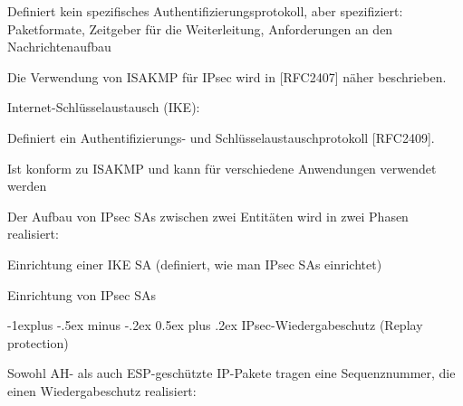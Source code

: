 \documentclass[a4paper]{article}
\makeatletter
\renewcommand{\subsection}{\@startsection{subsection}{2}{0mm}%
 {-1explus -.5ex minus -.2ex}%
 {0.5ex plus .2ex}%
 {\normalfont\normalsize\bfseries}}
\makeatother
\begin{document}
\begin{multicols}{3}
\begin{itemize*}
\begin{itemize*}
\begin{itemize*}
                        \item Definiert kein spezifisches Authentifizierungsprotokoll, aber spezifiziert: Paketformate, Zeitgeber für die Weiterleitung, Anforderungen an den Nachrichtenaufbau
                        \item Die Verwendung von ISAKMP für IPsec wird in {[}RFC2407{]} näher beschrieben.
                  \end{itemize*}
                  \item Internet-Schlüsselaustausch (IKE):
                  \begin{itemize*}
                        \item Definiert ein Authentifizierungs- und Schlüsselaustauschprotokoll {[}RFC2409{]}.
                        \item Ist konform zu ISAKMP und kann für verschiedene Anwendungen verwendet werden
                        \item Der Aufbau von IPsec SAs zwischen zwei Entitäten wird in zwei Phasen realisiert:
                        \item Einrichtung einer IKE SA (definiert, wie man IPsec SAs einrichtet)
                        \item Einrichtung von IPsec SAs
                  \end{itemize*}
            \end{itemize*}
      \end{itemize*}


      \subsection{IPsec-Wiedergabeschutz (Replay
            protection)}

      \begin{itemize*}
            \item
            Sowohl AH- als auch ESP-geschützte IP-Pakete tragen eine
            Sequenznummer, die einen Wiedergabeschutz realisiert:


\end{itemize*}
\end{multicols}
\end{document}
